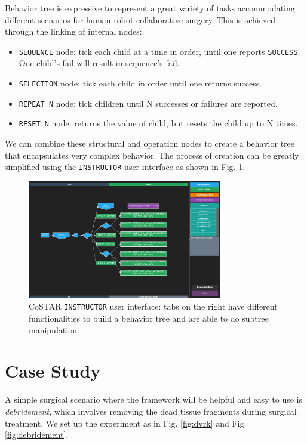 \documentclass[letterpaper, 10 pt, conference]{ieeeconf}
\begin{document}
Behavior tree is expressive to represent a great variety of tasks accommodating different scenarios for human-robot collaborative surgery. This is achieved through the linking of internal nodes:
 
\begin{itemize}
\item \texttt{SEQUENCE} node: tick each child at a time in order, until one reports \texttt{SUCCESS}. One child's fail will result in sequence's fail.
\item \texttt{SELECTION} node: tick each child in order until one returns success.
\item \texttt{REPEAT N} node: tick children until N successes or failures are reported.
\item \texttt{RESET N} node: returns the value of child, but resets the child up to N times.
\end{itemize} 

We can combine these structural and operation nodes to create a behavior tree that encapsulates very complex behavior. The process of creation can be greatly simplified using the \texttt{INSTRUCTOR} user interface as shown in Fig. \ref{fig:instructor}.

\begin{figure}[bt]
\centering
\includegraphics[width=240pt]{instructor.png}
\caption{CoSTAR \texttt{INSTRUCTOR} user interface: tabs on the right have different functionalities to build a behavior tree and are able to do subtree manipulation. }
\label{fig:instructor}
\end{figure}


\section{Case Study}
A simple surgical scenario where the framework will be helpful and easy to use is \textit{debridement}, which involves removing the dead tissue fragments during surgical treatment. We set up the experiment as in Fig. \ref{fig:dvrk} and Fig. \ref{fig:debridement}. 
\end{document}
